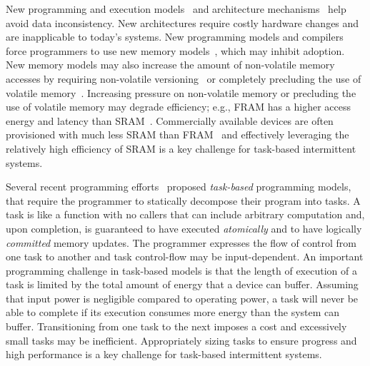 New programming and execution models~\cite{dino,ratchet,chain,alpaca} and
architecture mechanisms~\cite{clank,idetic,nvp} help avoid data
inconsistency. New architectures require costly hardware changes and are
inapplicable to today's systems. New programming models and compilers force
programmers to use new memory models~\cite{chain,ratchet}, which may inhibit
adoption. New memory models may also increase the amount of non-volatile
memory accesses by requiring non-volatile versioning~\cite{chain} or completely
precluding the use of volatile memory~\cite{ratchet}. Increasing pressure on
non-volatile memory or precluding the use of volatile memory may degrade
efficiency; e.g., FRAM has a higher access energy and latency than
SRAM~\cite{alpaca,wisp}. Commercially available devices are often provisioned
with much less SRAM than FRAM~\cite{wolverine,wisp} and effectively leveraging
the relatively high efficiency of SRAM is a key challenge for task-based
intermittent systems.


Several recent programming efforts~\cite{alpaca,chain} proposed {\em
task-based} programming models, that require the programmer to statically
decompose their program into tasks. A task is like a function with no callers
that can include arbitrary computation and, upon completion, is guaranteed to
have executed {\em atomically} and to have logically {\em committed} memory
updates. The programmer expresses the flow of control from one task to another
and task control-flow may be input-dependent. An important programming
challenge in task-based models is that the length of execution of a task is
limited by the total amount of energy that a device can buffer. Assuming that
input power is negligible compared to operating power, a task will never be
able to complete if its execution consumes more energy than the system can
buffer. Transitioning from one task to the next imposes a cost and excessively
small tasks may be inefficient. Appropriately sizing tasks to ensure progress
and high performance is a key challenge for task-based intermittent systems. 

